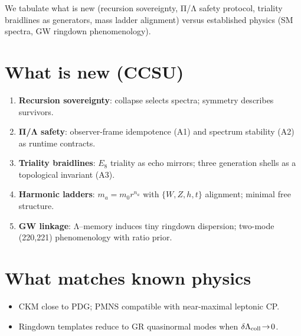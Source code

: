 We tabulate what is new (recursion sovereignty, Π/Λ safety protocol, triality braidlines as generators, mass ladder alignment) versus established physics (SM spectra, GW ringdown phenomenology).
\section*{What is new (CCSU)}
\begin{enumerate}
\item \textbf{Recursion sovereignty}: collapse selects spectra; symmetry describes survivors.
\item \textbf{Π/Λ safety}: observer-frame idempotence (A1) and spectrum stability (A2) as runtime contracts.
\item \textbf{Triality braidlines}: $E_8$ triality as echo mirrors; three generation shells as a topological invariant (A3).
\item \textbf{Harmonic ladders}: $m_a=m_0 r^{n_a}$ with $\{W,Z,h,t\}$ alignment; minimal free structure.
\item \textbf{GW linkage}: Λ–memory induces tiny ringdown dispersion; two-mode (220,221) phenomenology with ratio prior.
\end{enumerate}

\section*{What matches known physics}
\begin{itemize}
\item CKM close to PDG; PMNS compatible with near-maximal leptonic CP.
\item Ringdown templates reduce to GR quasinormal modes when $\delta\Lambda_{\rm coll}\!\to\!0$.
\end{itemize}
